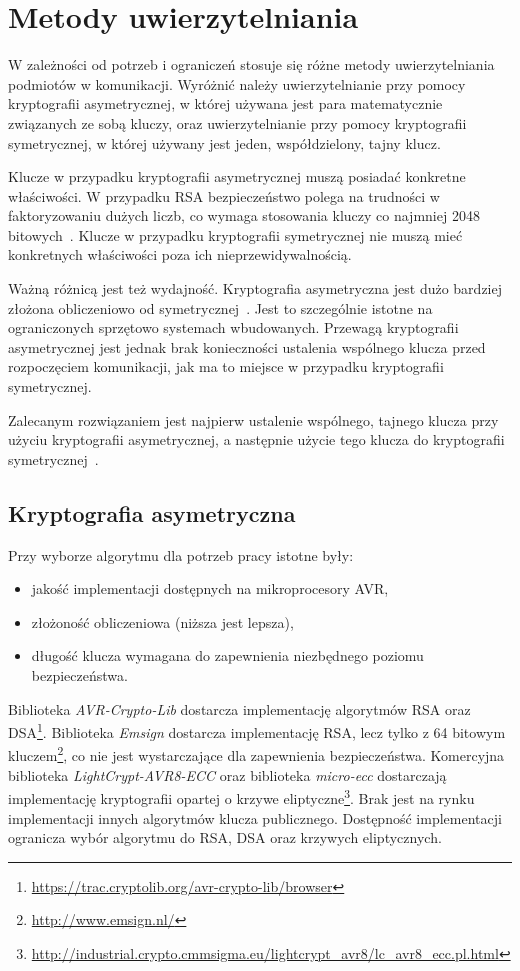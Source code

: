 \chapter{Metody uwierzytelniania}
\label{cha:metodyUwierzytelniania}

W zależności od potrzeb i ograniczeń stosuje się różne metody uwierzytelniania podmiotów w komunikacji. Wyróżnić należy uwierzytelnianie przy pomocy kryptografii asymetrycznej, w której używana jest para matematycznie związanych ze sobą kluczy, oraz uwierzytelnianie przy pomocy kryptografii symetrycznej, w której używany jest jeden, współdzielony, tajny klucz.

Klucze w przypadku kryptografii asymetrycznej muszą posiadać konkretne właściwości. W przypadku RSA bezpieczeństwo polega na trudności w faktoryzowaniu dużych liczb, co wymaga stosowania kluczy co najmniej 2048 bitowych~\cite{Nist}. Klucze w przypadku kryptografii symetrycznej nie muszą mieć konkretnych właściwości poza ich nieprzewidywalnością.

Ważną różnicą jest też wydajność. Kryptografia asymetryczna jest dużo bardziej złożona obliczeniowo od symetrycznej~\cite{al2008comparative}. Jest to szczególnie istotne na ograniczonych sprzętowo systemach wbudowanych. Przewagą kryptografii asymetrycznej jest jednak brak konieczności ustalenia wspólnego klucza przed rozpoczęciem komunikacji, jak ma to miejsce w przypadku kryptografii symetrycznej.

Zalecanym rozwiązaniem jest najpierw ustalenie wspólnego, tajnego klucza przy użyciu kryptografii asymetrycznej, a następnie użycie tego klucza do kryptografii symetrycznej~\cite{al2008comparative}.

\section{Kryptografia asymetryczna}
\label{sec:kryptoAsym}

Przy wyborze algorytmu dla potrzeb pracy istotne były:

\begin{itemize}
\item jakość implementacji dostępnych na mikroprocesory AVR,
\item złożoność obliczeniowa (niższa jest lepsza),
\item długość klucza wymagana do zapewnienia niezbędnego poziomu bezpieczeństwa.
\end{itemize}

Biblioteka \emph{AVR-Crypto-Lib} dostarcza implementację algorytmów RSA oraz DSA\footnote{\url{https://trac.cryptolib.org/avr-crypto-lib/browser}}. Biblioteka \emph{Emsign} dostarcza implementację RSA, lecz tylko z 64 bitowym kluczem\footnote{\url{http://www.emsign.nl/}}, co nie jest wystarczające dla zapewnienia bezpieczeństwa. Komercyjna biblioteka \emph{LightCrypt-AVR8-ECC} oraz biblioteka \emph{micro-ecc} dostarczają implementację kryptografii opartej o krzywe eliptyczne\footnote{\url{http://industrial.crypto.cmmsigma.eu/lightcrypt_avr8/lc_avr8_ecc.pl.html}}. Brak jest na rynku implementacji innych algorytmów klucza publicznego. Dostępność implementacji ogranicza wybór algorytmu do RSA, DSA oraz krzywych eliptycznych.

